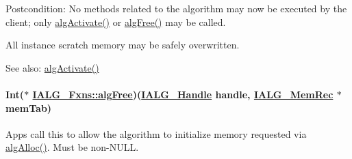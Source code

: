 \begin{Desc}
\item[Postcondition:]No methods related to the algorithm may now be executed by the client; only \hyperlink{struct_i_a_l_g___fxns_f1213efc8ac6fdfb72b50da9950baaa7}{alg\-Activate()} or \hyperlink{struct_i_a_l_g___fxns_c6f87b240d96486e3e88e80b95046ade}{alg\-Free()} may be called.

All instance scratch memory may be safely overwritten.\end{Desc}
\begin{Desc}
\item[See also:]\hyperlink{struct_i_a_l_g___fxns_f1213efc8ac6fdfb72b50da9950baaa7}{alg\-Activate()} \end{Desc}
\hypertarget{struct_i_a_l_g___fxns_c6f87b240d96486e3e88e80b95046ade}{
\paragraph[algFree]{\setlength{\rightskip}{0pt plus 5cm}Int($\ast$ \hyperlink{struct_i_a_l_g___fxns_c6f87b240d96486e3e88e80b95046ade}{IALG\_\-Fxns::alg\-Free})(\hyperlink{struct_i_a_l_g___obj}{IALG\_\-Handle} handle, \hyperlink{struct_i_a_l_g___mem_rec}{IALG\_\-Mem\-Rec} $\ast$mem\-Tab)}\hfill}
\label{struct_i_a_l_g___fxns_c6f87b240d96486e3e88e80b95046ade}


Apps call this to allow the algorithm to initialize memory requested via \hyperlink{struct_i_a_l_g___fxns_1640ba8f4033af1ce3887283c7a12746}{alg\-Alloc()}. Must be non-NULL. 

